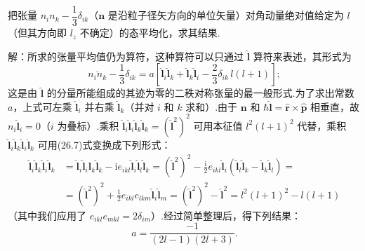 \begin{xiti}

\quad 把张量 $n_in_k-\dfrac{1}{3}\delta_{ik}$（$\boldsymbol{n}$ 是沿粒子径矢方向的单位矢量）对角动量绝对值给定为 $l$（但其方向即 $l_z$ 不确定）的态平均化，求其结果.

解：所求的张量平均值仍为算符，这种算符可以只通过 $\hat{\boldsymbol{l}}$ 算符来表述，其形式为
\begin{equation*}
  \overline{n_in_k}-\frac{1}{3}\delta_{ik}
  =a\left[\hat{\boldsymbol{l}}_i\hat{\boldsymbol{l}}_k
  +\hat{\boldsymbol{l}}_k\hat{\boldsymbol{l}}_i
  -\frac{2}{3}\delta_{ik}\,l(l+1)\right];
\end{equation*}
这是由 $\hat{\boldsymbol{l}}$ 的分量所能组成的其迹为零的二秩对称张量的最一般形式.为了求出常数 $a$，上式可左乘 $\hat{\boldsymbol{l}}_i$ 并右乘 $\hat{\boldsymbol{l}}_k$（并对 $i$ 和 $k$ 求和）.由于 $\boldsymbol{n}$ 和 $\hbar\hat{\boldsymbol{l}}=\hat{\boldsymbol{r}}\times\hat{\boldsymbol{p}}$ 相垂直，故 $n_i\hat{\boldsymbol{l}}_i=0$（$i$ 为叠标）.乘积 $\hat{\boldsymbol{l}}_i\hat{\boldsymbol{l}}_i\hat{\boldsymbol{l}}_k\hat{\boldsymbol{l}}_k=(\hat{\boldsymbol{l}}^2)^2$ 可用本征值 $l^2(l+1)^2$ 代替，乘积 $\hat{\boldsymbol{l}}_i\hat{\boldsymbol{l}}_k\hat{\boldsymbol{l}}_i\hat{\boldsymbol{l}}_k$ 可用(26.7)式变换成下列形式：
\begin{equation*}
\begin{aligned}
  \hat{\boldsymbol{l}}_i\hat{\boldsymbol{l}}_k\hat{\boldsymbol{l}}_i\hat{\boldsymbol{l}}_k
  &=\hat{\boldsymbol{l}}_i\hat{\boldsymbol{l}}_i\hat{\boldsymbol{l}}_k\hat{\boldsymbol{l}}_k
  -\mathrm{i}e_{ikl}\hat{\boldsymbol{l}}_i\hat{\boldsymbol{l}}_l\hat{\boldsymbol{l}}_k
  =(\hat{\boldsymbol{l}}^2)^2
  -\frac{\mathrm{i}}{2}e_{ikl}\hat{\boldsymbol{l}}_i
  \left(\hat{\boldsymbol{l}}_l\hat{\boldsymbol{l}}_k
  -\hat{\boldsymbol{l}}_k\hat{\boldsymbol{l}}_l\right)=\\
  &=(\hat{\boldsymbol{l}}^2)^2
  +\frac{1}{2}e_{ikl}e_{lkm}\hat{\boldsymbol{l}}_i\hat{\boldsymbol{l}}_m
  =(\hat{\boldsymbol{l}}^2)^2-\hat{\boldsymbol{l}}^2
  =l^2(l+1)^2-l(l+1)
\end{aligned}
\end{equation*}
（其中我们应用了 $e_{ikl}e_{mkl}=2\delta_{im}$）.经过简单整理后，得下列结果：
\begin{equation*}
  a=\frac{-1}{(2l-1)(2l+3)}.
\end{equation*}

\end{xiti}

